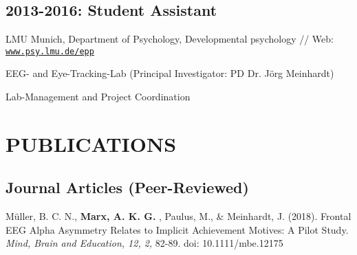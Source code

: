 \documentclass[letterpaper]{article}
\renewenvironment{itemize}{ %
  \begin{list}{}{ %
    \setlength{\leftmargin}{2.5em} %
  }
}{
  \end{list}
}
\begin{document}
\subsection*{2013-2016: Student Assistant}
\begin{itemize}
  \item LMU Munich, Department of Psychology, Developmental psychology // Web: \href{https://www.psy.lmu.de/epp/}{\tt www.psy.lmu.de/epp}
    \item EEG- and Eye-Tracking-Lab (Principal Investigator: PD Dr. Jörg Meinhardt)
  \item Lab-Management and Project Coordination
\end{itemize}


\section*{PUBLICATIONS}
\subsection*{Journal Articles (Peer-Reviewed)}
\begin{itemize}
\item Müller, B. C. N.,  {\bf Marx, A. K. G. }, Paulus, M., \& Meinhardt, J. (2018). Frontal EEG Alpha Asymmetry Relates to Implicit Achievement Motives: A Pilot Study. {\it Mind, Brain and Education, 12, 2,} 82-89. doi: 10.1111/mbe.12175 
\end{itemize}
\end{document}
